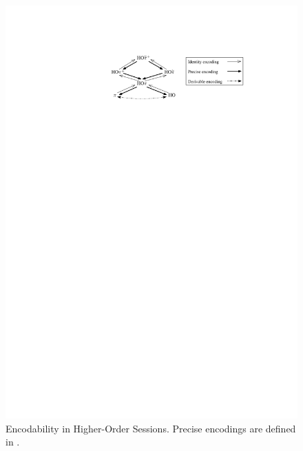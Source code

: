 \documentclass[runningheads]{llncs}
\begin{document}
\begin{figure}[t]
\centering
\includegraphics[scale=1]{diag.pdf}

	\caption{Encodability in Higher-Order Sessions. 
	Precise encodings are defined in .
	\label{fig:express}}
\vspace{-5mm}
\Hlinefig
\end{figure}
\end{document}
